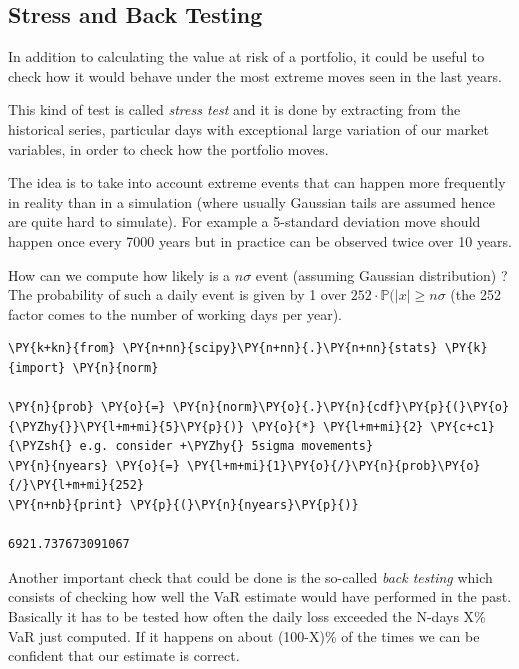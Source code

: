 \subsection{Stress and Back Testing}\label{stress-testing-and-back-testing}

In addition to calculating the value at risk of a portfolio, it could be useful to 
check how it would behave under the most extreme moves seen in the last years.

This kind of test is called \emph{stress test} and it is done by extracting from the historical series, particular days with exceptional large variation of our market variables, in order to check how the portfolio moves.
 
The idea is to take into account extreme events that can happen more frequently in reality than in a simulation (where usually Gaussian tails are assumed hence are quite hard to simulate). For example a 5-standard deviation move should happen once every 7000 years but in practice can be observed twice over 10 years.

How can we compute how likely is a $n\sigma$ event (assuming Gaussian distribution) ?
The probability of such a daily event is given by 1 over $252\cdot\mathbb{P}(|x| \ge n\sigma$ (the 252 factor comes to the number of working days per year).

\begin{tcolorbox}[breakable, size=fbox, boxrule=1pt, pad at break*=1mm,colback=cellbackground, colframe=cellborder]
\begin{Verbatim}[commandchars=\\\{\}]
\PY{k+kn}{from} \PY{n+nn}{scipy}\PY{n+nn}{.}\PY{n+nn}{stats} \PY{k}{import} \PY{n}{norm}

\PY{n}{prob} \PY{o}{=} \PY{n}{norm}\PY{o}{.}\PY{n}{cdf}\PY{p}{(}\PY{o}{\PYZhy{}}\PY{l+m+mi}{5}\PY{p}{)} \PY{o}{*} \PY{l+m+mi}{2} \PY{c+c1}{\PYZsh{} e.g. consider +\PYZhy{} 5sigma movements}
\PY{n}{nyears} \PY{o}{=} \PY{l+m+mi}{1}\PY{o}{/}\PY{n}{prob}\PY{o}{/}\PY{l+m+mi}{252}
\PY{n+nb}{print} \PY{p}{(}\PY{n}{nyears}\PY{p}{)}

6921.737673091067
    \end{Verbatim}
\end{tcolorbox}

Another important check that could be done is the so-called \emph{back testing}
which consists of checking how well the VaR estimate would have
performed in the past. Basically it has to be tested how often the daily
loss exceeded the N-days X\% VaR just computed. If it happens on about
(100-X)\% of the times we can be confident that our estimate is correct.

